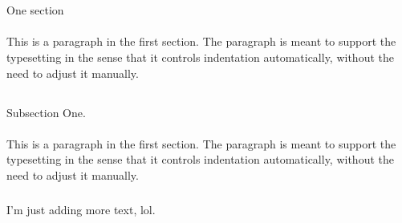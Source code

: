 \documentclass[a4paper]{article}
\begin{document}
\section{}
One section

\paragraph{}
This is a paragraph in the first section.  The paragraph is meant to support the typesetting in the sense that it controls indentation automatically, without the need to adjust it manually.

\subsection{}
Subsection One.

\paragraph{}
This is a paragraph in the first section.  The paragraph is meant to support the typesetting in the sense that it controls indentation automatically, without the need to adjust it manually.

\subparagraph{}
I'm just adding more text, lol.
\end{document}
